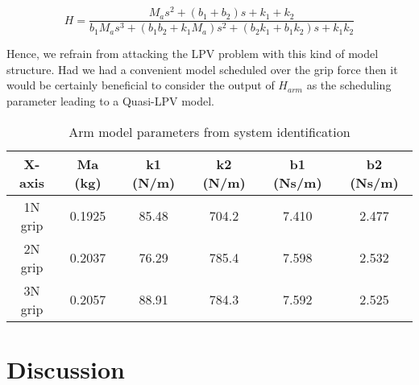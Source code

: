 \[
H = \frac{M_a s^2 +(b_1 +b_2 )s+k_1 +k_2}{b_1 M_a s^3 +(b_1 b_2 +k_1 M_a )s^2 +(b_2 k_1 +b_1 k_2 )s+k_1 k_2}
\]

Hence, we refrain from attacking the LPV problem with this kind of model structure. Had we had a convenient 
model scheduled over the grip force then it would be certainly beneficial to consider the output of $H_{arm}$
as the scheduling parameter leading to a Quasi-LPV model. 


\begin{table}%
\centering
\begin{tabular}{cccccc}
X-axis           & Ma (kg)       &k1   (N/m)      &k2   (N/m)      &b1  (Ns/m)          &b2  (Ns/m)\\ \hline
1N grip          &0.1925            &85.48            & 704.2             & 7.410              &  2.477\\
2N grip          &0.2037            &76.29            & 785.4             & 7.598              &  2.532\\
3N grip          &0.2057            &88.91            & 784.3             & 7.592              &  2.525\\

\end{tabular}
\caption{Arm model parameters from system identification}
\label{tab:fucav}
\end{table}

\section{Discussion}

